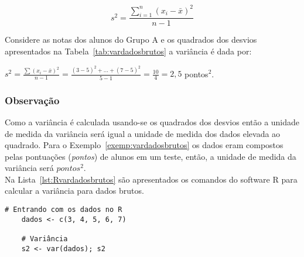\documentclass[11pt,fleqn]{book} %
\begin{document}
\begin{eBox}
\vspace{-0.5cm}
\begin{equation} \label{eq:vardadosbrutos}
s^2=\frac{\displaystyle\sum_{i=1}^{n}(x_i-\bar{x})^2}{n-1} 
\end{equation}
\end{eBox}

\vspace{0,3cm}


\begin{example} \label{exemp:vardadosbrutos}

Considere as notas dos alunos do Grupo A e os quadrados dos desvios apresentados na Tabela~\ref{tab:vardadosbrutos} a variância é dada por:

\begin{center}
$\displaystyle s^2=\frac{\sum(x_i-\bar{x})^2}{n-1} = \frac{(3-5)^2+...+(7-5)^2}{5-1} = \frac{10}{4} = 2,5$ pontos$^2$.
\end{center}

\end{example}

\subsubsection{Observação}
\vspace{0,3cm}

Como a variância é calculada usando-se os quadrados dos desvios então a unidade de medida da variância será igual a unidade de medida dos dados elevada ao quadrado. Para o Exemplo~\ref{exemp:vardadosbrutos} os dados eram compostos pelas pontuações ({\itshape pontos}) de alunos em um teste, então, a unidade de medida da variância será $pontos^2$. \\


Na Lista~\ref{lst:Rvardadosbrutos} são apresentados os comandos do software R para calcular a variância para dados brutos. \\

\begin{scriptsize}
	\estiloR
	\begin{lstlisting}[caption={Comandos do software R}, label=lst:Rvardadosbrutos]
	# Entrando com os dados no R
	dados <- c(3, 4, 5, 6, 7)
	
	# Variância
	s2 <- var(dados); s2

	\end{lstlisting}
\end{scriptsize}
\end{document}

